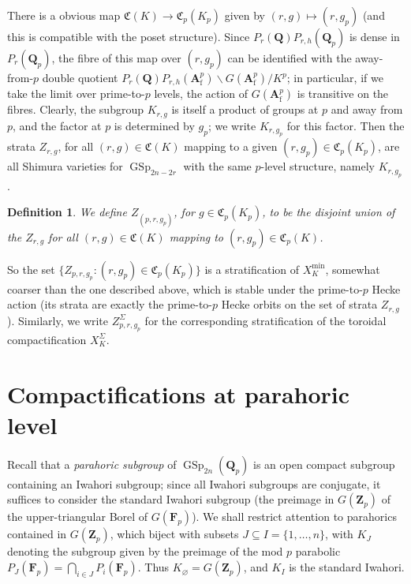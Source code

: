 \documentclass[cjm]{ipart}
\theoremstyle{plain}
\newtheorem{definition}[theorem]{Definition}
\theoremstyle{remark}
\DeclareMathOperator{\GSp}{GSp}
\newcommand{\Af}{\AA_{\mathrm{f}}}
\newcommand{\Fp}{\mathbf{F}_p}
\newcommand{\QQ}{\mathbf{Q}}
\newcommand{\Qp}{\QQ_p}
\newcommand{\Zp}{\mathbf{Z}_p}
\renewcommand{\AA}{\mathbf{A}}
\numberwithin{equation}{subsection}
\begin{document}
  There is a obvious map $\mathfrak{C}(K) \to \mathfrak{C}_p(K_p)$ given by $(r, g) \mapsto (r, g_p)$ (and this is compatible with the poset structure). Since $P_r(\QQ) P_{r, h}(\Qp)$ is dense in $P_r(\Qp)$, the fibre of this map over $(r, g_p)$ can be identified with the away-from-$p$ double quotient $P_r(\QQ) P_{r, h}(\Af^p) \backslash G(\Af^p) / K^p$; in particular, if we take the limit over prime-to-$p$ levels, the action of $G(\Af^p)$ is transitive on the fibres. Clearly, the subgroup $K_{r, g}$ is itself a product of groups at $p$ and away from $p$, and the factor at $p$ is determined by $g_p$; we write $K_{r, g_p}$ for this factor. Then the strata $Z_{r, g}$, for all $(r, g) \in \mathfrak{C}(K)$ mapping to a given $(r, g_p) \in \mathfrak{C}_p(K_p)$, are all Shimura varieties for $\GSp_{2n-2r}$ with the same $p$-level structure, namely $K_{r, g_p}$.

  \begin{definition}
   We define $Z_{(p, r, g_p)}$, for $g \in \mathfrak{C}_p(K_p)$, to be the disjoint union of the $Z_{r, g}$ for all $(r, g) \in \mathfrak{C}(K)$ mapping to $(r, g_p) \in \mathfrak{C}_p(K)$.
  \end{definition}

  So the set $\{ Z_{p, r, g_p} : (r, g_p) \in \mathfrak{C}_p(K_p)\}$ is a stratification of $X_K^{\min}$, somewhat coarser than the one described above, which is stable under the prime-to-$p$ Hecke action (its strata are exactly the prime-to-$p$ Hecke orbits on the set of strata $Z_{r, g}$). Similarly, we write $Z_{p, r, g_p}^{\Sigma}$ for the corresponding stratification of the toroidal compactification $X_K^{\Sigma}$.

\section{Compactifications at parahoric level}

 Recall that a \emph{parahoric subgroup} of $\GSp_{2n}(\Qp)$ is an open compact subgroup containing an Iwahori subgroup; since all Iwahori subgroups are conjugate, it suffices to consider the standard Iwahori subgroup (the preimage in $G(\Zp)$ of the upper-triangular Borel of $G(\Fp)$). We shall restrict attention to parahorics contained in $G(\Zp)$, which biject with subsets $J \subseteq I = \{1, \dots, n\}$, with $K_J$ denoting the subgroup given by the preimage of the mod $p$ parabolic $P_J(\Fp) = \bigcap_{i \in J} P_i(\Fp)$. Thus $K_{\varnothing} = G(\Zp)$, and $K_I$ is the standard Iwahori.
\end{document}
